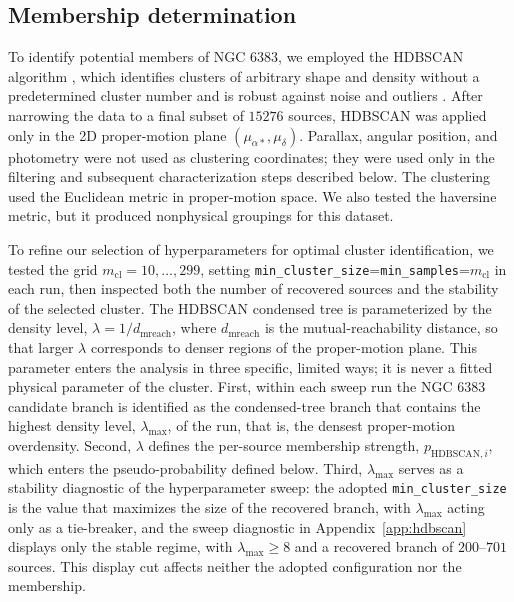 \documentclass{aa}
\begin{document}
\subsection{Membership determination}\label{subsubsec:membership}
To identify potential members of NGC 6383, we employed the HDBSCAN algorithm \citep{10.1007/978-3-642-37456-2_14,McInnes2017}, which identifies clusters of arbitrary shape and density without a predetermined cluster number and is robust against noise and outliers \citep{2021A&A...646A.104H}. After narrowing the data to a final subset of $15276$ sources, HDBSCAN was applied only in the 2D proper-motion plane $(\mu_{\alpha*},\mu_\delta)$. Parallax, angular position, and photometry were not used as clustering coordinates; they were used only in the filtering and subsequent characterization steps described below. The clustering used the Euclidean metric in proper-motion space. We also tested the haversine metric, but it produced nonphysical groupings for this dataset.

To refine our selection of hyperparameters for optimal cluster identification, we tested the grid $m_{\mathrm{cl}}=10,\ldots,299$, setting \texttt{min\_cluster\_size}=\texttt{min\_samples}=$m_{\mathrm{cl}}$ in each run, then inspected both the number of recovered sources and the stability of the selected cluster. The HDBSCAN condensed tree is parameterized by the density level, $\lambda=1/d_{\mathrm{mreach}}$, where $d_{\mathrm{mreach}}$ is the mutual-reachability distance, so that larger $\lambda$ corresponds to denser regions of the proper-motion plane. This parameter enters the analysis in three specific, limited ways; it is never a fitted physical parameter of the cluster. First, within each sweep run the NGC 6383 candidate branch is identified as the condensed-tree branch that contains the highest density level, $\lambda_{\mathrm{max}}$, of the run, that is, the densest proper-motion overdensity. Second, $\lambda$ defines the per-source membership strength, $p_{\mathrm{HDBSCAN},i}$, which enters the pseudo-probability defined below. Third, $\lambda_{\mathrm{max}}$ serves as a stability diagnostic of the hyperparameter sweep: the adopted \texttt{min\_cluster\_size} is the value that maximizes the size of the recovered branch, with $\lambda_{\mathrm{max}}$ acting only as a tie-breaker, and the sweep diagnostic in Appendix~\ref{app:hdbscan} displays only the stable regime, with $\lambda_{\mathrm{max}}\geq8$ and a recovered branch of $200$--$701$ sources. This display cut affects neither the adopted configuration nor the membership.
\end{document}
